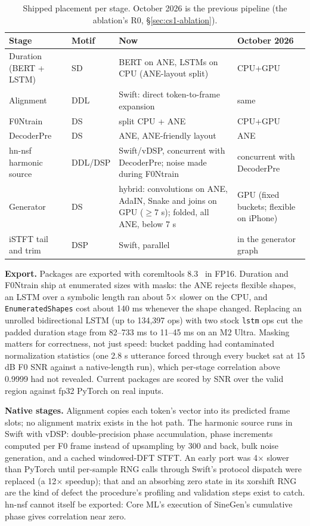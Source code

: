 \documentclass[11pt]{article}
\newcommand{\code}[1]{\texttt{#1}}
\begin{document}
\begin{table}[h]
\centering
\small
\caption{Shipped placement per stage. October 2026 is the previous pipeline (the ablation's R0, \S\ref{sec:cs1-ablation}).}
\label{tab:cs1-placement}
\begin{tabularx}{\linewidth}{llXl}
\toprule
Stage & Motif & Now & October 2026 \\
\midrule
Duration (BERT + LSTM) & SD & BERT on ANE, LSTMs on CPU (ANE-layout split) & CPU+GPU \\
Alignment & DDL & Swift: direct token-to-frame expansion & same \\
F0Ntrain & DS & split CPU + ANE & CPU+GPU \\
DecoderPre & DS & ANE, ANE-friendly layout & ANE \\
hn-nsf harmonic source & DDL/DSP & Swift/vDSP, concurrent with DecoderPre; noise made during F0Ntrain & concurrent with DecoderPre \\
Generator & DS & hybrid: convolutions on ANE, AdaIN, Snake and joins on GPU ($\geq$7 s); folded, all ANE, below 7 s & GPU (fixed buckets; flexible on iPhone) \\
iSTFT tail and trim & DSP & Swift, parallel & in the generator graph \\
\bottomrule
\end{tabularx}
\end{table}

\textbf{Export.} Packages are exported with coremltools 8.3~\citep{coremltools,coremltools-pytorch} in FP16. Duration and F0Ntrain ship at enumerated sizes with masks: the ANE rejects flexible shapes, an LSTM over a symbolic length ran about 5$\times$ slower on the CPU, and \code{EnumeratedShapes} cost about 140 ms whenever the shape changed. Replacing an unrolled bidirectional LSTM (up to 134,397 ops) with two stock \code{lstm} ops cut the padded duration stage from 82--733 ms to 11--45 ms on an M2 Ultra. Masking matters for correctness, not just speed: bucket padding had contaminated normalization statistics (one 2.8 s utterance forced through every bucket sat at 15 dB F0 SNR against a native-length run), which per-stage correlation above 0.9999 had not revealed. Current packages are scored by SNR over the valid region against fp32 PyTorch on real inputs.

\textbf{Native stages.} Alignment copies each token's vector into its predicted frame slots; no alignment matrix exists in the hot path. The harmonic source runs in Swift with vDSP: double-precision phase accumulation, phase increments computed per F0 frame instead of upsampling by 300 and back, bulk noise generation, and a cached windowed-DFT STFT. An early port was 4$\times$ slower than PyTorch until per-sample RNG calls through Swift's protocol dispatch were replaced (a 12$\times$ speedup); that and an absorbing zero state in its xorshift RNG are the kind of defect the procedure's profiling and validation steps exist to catch. hn-nsf cannot itself be exported: Core ML's execution of SineGen's cumulative phase gives correlation near zero.
\end{document}
